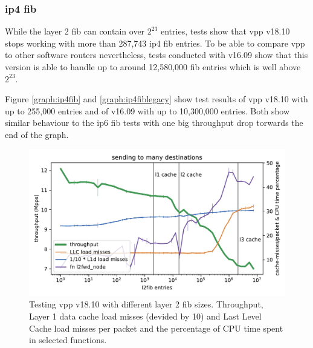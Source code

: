 \subsubsection{\Ac{ip4} \Ac{fib}}
\label{sec:ip4fib}

While the layer 2 \Ac{fib} can contain over $2^{23}$ entries, tests
show that \Ac{vpp} v18.10 stops working with more than 287,743
\Ac{ip4} \Ac{fib} entries. To be able to compare \Ac{vpp} to other
software routers nevertheless, tests conducted with v16.09 show that
this version is able to handle up to around 12,580,000 \Ac{fib}
entries which is well above $2^{23}$.

Figure \ref{graph:ip4fib} and \ref{graph:ip4fiblegacy} show test results of \Ac{vpp} v18.10 with up to 255,000 entries and of v16.09 with up to 10,300,000 entries. Both show similar behaviour to the \Ac{ip6} \Ac{fib} tests with one big throughput drop torwards the end of the graph. 



\begin{figure}[!ht]
\noindent\hspace{0.5mm}\includegraphics[width=\linewidth]{pics/throughput_l2_throughmac_klaipeda32ghz_v2.pdf}
\caption{Testing \Ac{vpp} v18.10 with different layer 2 \Ac{fib} sizes. Throughput, Layer 1 data cache load misses (devided by 10) and Last Level Cache load misses per packet and the percentage of CPU time spent in selected functions. }
\label{graph:l2fib}
\end{figure}

